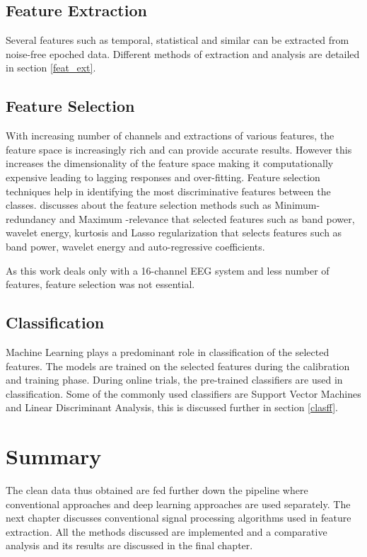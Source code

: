 \subsection{Feature Extraction}
Several features such as temporal, statistical and similar can be extracted from noise-free epoched data. Different methods of extraction and analysis are detailed in section \ref{feat_ext}.

\subsection{Feature Selection}
With increasing number of channels and extractions of various features, the feature space is increasingly rich and can provide accurate results. However this increases the dimensionality of the feature space making it computationally expensive leading to lagging responses and over-fitting. Feature selection techniques help in identifying the most discriminative features between the classes. \cite{2017_MI_ML_SP} discusses about the feature selection methods such as Minimum-redundancy and Maximum -relevance that selected features such as band power, wavelet energy, kurtosis and Lasso regularization that selects features such as band power, wavelet energy and auto-regressive coefficients.

As this work deals only with a 16-channel EEG system and less number of features, feature selection was not essential.

\subsection{Classification}
Machine Learning plays a predominant role in classification of the selected features. The models are trained on the selected features during the calibration and training phase. During online trials, the pre-trained classifiers are used in classification. Some of the commonly used classifiers are Support Vector Machines and Linear Discriminant Analysis, this is discussed further in section \ref{clasff}.

\section{Summary}
The clean data thus obtained are fed further down the pipeline where conventional approaches and deep learning approaches are used separately. The next chapter discusses conventional signal processing algorithms used in feature extraction. All the methods discussed are implemented and a comparative analysis and its results are discussed in the final chapter.